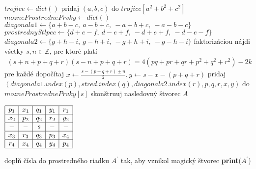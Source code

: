 \begin{algorithmic}
\STATE $trojice \gets dict()$
    \STATE pridaj $(a,b,c)$ do $trojice[a^2 + b^2 + c^2]$
\ENDFOR
{}
	  \STATE $mozneProstrednePrvky \gets dict()$
	  \STATE $diagonala1 \gets \{a+b-c,~a-b+c,~-a+b+c,~-a-b-c\}$
	  \STATE $prostrednyStlpec \gets \{d+e-f,~d-e+f,~-d+e+f,~-d-e-f\}$
	  \STATE $diagonala2 \gets \{g+h-i,~g-h+i,~-g+h+i,~-g-h-i\}$
		\STATE faktorizáciou nájdi všetky $s,n \in \mathbb{Z}$, pre ktoré platí
				\begin{gather*}
				(s+n+p+q+r)(s-n+p+q+r) = 4(pq + pr + qr + p^2 + q^2 + r^2) - 2k
				\end{gather*}
		\STATE pre každé dopočítaj $x \gets \frac{s - (p+q+r) \pm n}{2}, y \gets s - x - (p+q+r)$
			\STATE pridaj $(diagonala1.index(p),stred.index(q),diagonala2.index(r), p, q, r, x, y)$ do $mozneProstrednePrvky[s]$
		\ENDIF
	  \ENDFOR
    \ENDFOR
\ENDFOR
{}
		\STATE skonštruuj nasledovný štvorec $A$
		\STATE
		\begin{center}
		$\begin{array}{ |c|c|c|c|c| }
		\hline
		p_1 & x_1 & q_1 & y_1 & r_1 \\ 
		\hline
		x_2 & p_2 & q_2 & r_2 & y_2  \\ 
		\hline
		- & - & s & - & - \\ 
		\hline
		x_3 & r_3 & q_3 & p_3 & x_4 \\ 
		\hline
		r_4 & x_4 & q_4 & y_4 & p_4 \\
		\hline
		\end{array}$
		\end{center}
		\STATE
			\STATE doplň čísla do prostredného riadku $A^\prime$ tak, aby vznikol magický štvorec
				\STATE \textbf{print}($A^\prime$)
			\ENDIF
		\ENDFOR
	  \ENDIF
    \ENDFOR
\ENDFOR
\end{algorithmic}

